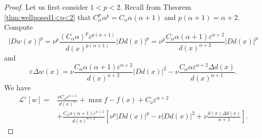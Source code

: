 \documentclass[12pt,reqno]{amsart}
\numberwithin{figure}{section}
\theoremstyle{plain}
\theoremstyle{remark}
\numberwithin{equation}{section}
\begin{document}
\begin{proof} Let us first consider $1<p<2$. Recall from Theorem \ref{thm:wellposed1<p<2} that $C_\alpha^p \alpha^p = C_\alpha \alpha (\alpha+1)$ and $p(\alpha+1) = \alpha+2$. Compute 
\begin{equation*}
    |D w(x)|^p = \nu^p\frac{(C_\alpha\alpha)^p\varepsilon^{p(\alpha+1)}}{d(x)^{p(\alpha+1)}} \left| Dd(x) \right|^p= \nu^p\frac{C_\alpha \alpha(\alpha+1)\varepsilon^{\alpha+2}}{d(x)^{\alpha+2}}  \left| Dd(x) \right|^p
\end{equation*}
and
\begin{equation*}
    \varepsilon\Delta w(x) = \nu\frac{C_\alpha\alpha(\alpha+1)\varepsilon^{\alpha+2}}{d(x)^{\alpha+2}} \left| Dd(x)\right|^2- \nu\frac{C_\alpha\alpha\varepsilon^{\alpha+2}\Delta d(x)}{d(x)^{\alpha+1}}.
\end{equation*}
We have
\begin{equation*}
    \begin{aligned}
        \mathcal{L}^\varepsilon\left[ w \right] =  &\frac{\nu C_\alpha\varepsilon^{\alpha+1}}{d(x)^\alpha} + \max f - f(x) + C_\nu \varepsilon^{\alpha+2} \\&+ \frac{C_\alpha \alpha (\alpha+1)\varepsilon^{\alpha+2}}{d(x)^{\alpha+2}}\left[\nu^p\left| Dd(x) \right|^p-\nu \left| Dd(x)\right|^2+\nu\frac{d(x)\Delta d(x)}{\alpha+1}\right] .
    \end{aligned}
\end{equation*}

\end{proof}
\end{document}
